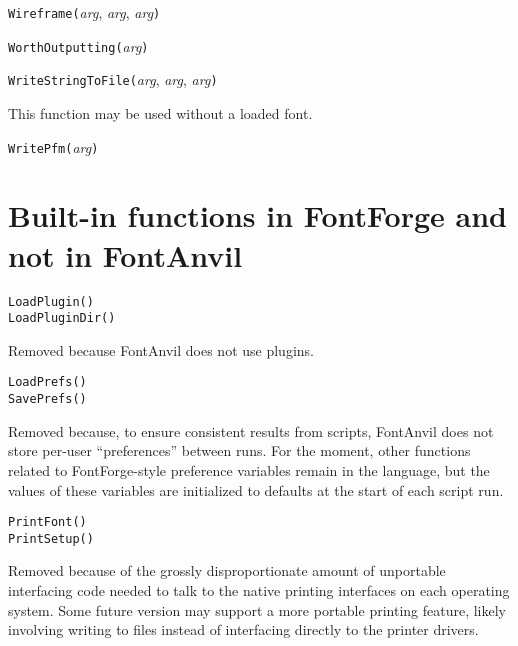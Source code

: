 

\texttt{Wireframe(}\textit{arg}, \textit{arg}, \textit{arg}\texttt{)}



\texttt{WorthOutputting(}\textit{arg}\texttt{)}



\texttt{WriteStringToFile(}\textit{arg}, \textit{arg}, \textit{arg}\texttt{)}

This function may be used without a loaded font.



\texttt{WritePfm(}\textit{arg}\texttt{)}


\section{Built-in functions in FontForge and not in FontAnvil}

\texttt{LoadPlugin()}\FFdiff\\
\texttt{LoadPluginDir()}

Removed because FontAnvil does not use plugins.

\noindent
\texttt{LoadPrefs()}\FFdiff\\
\texttt{SavePrefs()}

Removed because, to ensure consistent results from scripts, FontAnvil does
not store per-user ``preferences'' between runs.  For the moment, other
functions related to FontForge-style preference variables remain in the
language, but the values of these variables are initialized to defaults at
the start of each script run.

\noindent
\texttt{PrintFont()}\FFdiff\\
\texttt{PrintSetup()}

Removed because of the grossly disproportionate amount of unportable
interfacing code needed to talk to the native printing interfaces on each
operating system.  Some future version may support a more portable printing
feature, likely involving writing to files instead of interfacing directly
to the printer drivers.

